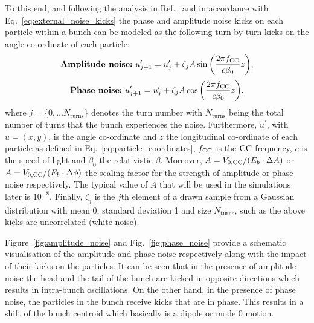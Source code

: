 To this end, and following the analysis in Ref.~\cite{PhysRevSTAB.18.101001} and in accordance with Eq.~\eqref{eq:external_noise_kicks} the phase and amplitude noise kicks on each particle within a bunch can be modeled as the following turn-by-turn kicks on the angle co-ordinate of each particle: %
\begin{equation}\label{eq:amplitude_noise_kick}
  \textbf{\textrm{Amplitude noise:}} \  u^\prime_{j+1} =  u^\prime_j + \zeta_j A \sin{\left (  \frac{2 \pi {f_\mathrm{CC}}}{c \beta_0}z   \right )},
\end{equation}
\begin{equation}\label{eq:phase_noise_kick}
    \textbf{\textrm{Phase noise:}} \ u^\prime_{j+1} =  u^\prime_j + \zeta_j A \cos{\left (  \frac{2 \pi {f_\mathrm{CC}}}{c \beta_0}z   \right )},
\end{equation}
where $j=\{ 0,\dots N_\mathrm{turns} \}$ denotes the turn number with $N_\mathrm{turns}$ being the total number of turns that the bunch experiences the noise. Furthermore, $u^\prime$, with $u=(x,y)$, is the angle co-ordinate and $z$ the longitudinal co-ordinate of each particle as defined in Eq.~\eqref{eq:particle_coordinates}, ${f_\mathrm{CC}}$ is the ${\mathrm{CC}}$ frequency, $c$ is the speed of light and $\beta_0$ the relativistic $\beta$. Moreover, $A={V_\mathrm{0, CC}} /(E_b \cdot \Delta A )$ or $A={V_\mathrm{0, CC}} /(E_b \cdot \Delta \phi )$ the scaling factor for the strength of amplitude or phase noise respectively. The typical value of $A$ that will be used in the simulations later is $10^{-8}$. Finally, $\zeta_j$ is the $j$th element of a drawn sample from a Gaussian distribution with mean 0, standard deviation 1 and size $N_\mathrm{turns}$, such as the above kicks are uncorrelated (white noise).

Figure~\ref{fig:amplitude_noise} and Fig.~\ref{fig:phase_noise} provide a schematic visualisation of the amplitude and phase noise respectively along with the impact of their kicks on the particles. It can be seen that in the presence of amplitude noise the head and the tail of the bunch are kicked in opposite directions which results in intra-bunch oscillations. On the other hand, in the presence of phase noise, the particles in the bunch receive kicks that are in phase. This results in a shift of the bunch centroid which basically is a dipole or mode 0 motion.


